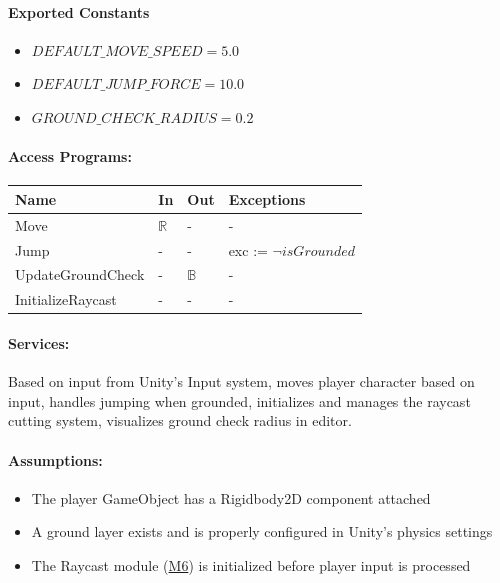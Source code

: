 \documentclass[12pt, titlepage]{article}
\begin{document}
\paragraph{Exported Constants}
\begin{itemize}
\item $DEFAULT\_MOVE\_SPEED = 5.0$
\item $DEFAULT\_JUMP\_FORCE = 10.0$
\item $GROUND\_CHECK\_RADIUS = 0.2$
\end{itemize}

\paragraph{Access Programs:}

\begin{center}
\begin{tabular}{p{4cm}p{1cm}p{1cm}p{5cm}}
\toprule
\textbf{Name} & \textbf{In} & \textbf{Out} & \textbf{Exceptions} \\
\midrule
Move & $\mathbb{R}$ & - & - \\
Jump & - & - & exc := $\neg isGrounded$ \\
UpdateGroundCheck & - & $\mathbb{B}$ & - \\
InitializeRaycast & - & - & - \\
\bottomrule
\end{tabular}
\end{center}

\paragraph{Services:}
Based on input from Unity's Input system, moves player character based on input, handles jumping when grounded, initializes and manages the raycast cutting system, visualizes ground check radius in editor.

\paragraph{Assumptions:}
\begin{itemize}
\item The player GameObject has a Rigidbody2D component attached
\item A ground layer exists and is properly configured in Unity's physics settings
\item The Raycast module (\hyperref[M6]{M6}) is initialized before player input is processed
\end{itemize}
\end{document}
